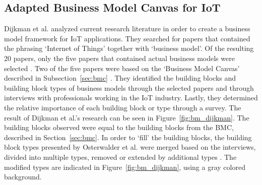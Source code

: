 	\subsection{Adapted Business Model Canvas for IoT}
	\vspace{-1em}
		Dijkman et al. \cite{dijkman} analyzed current research literature in order to create a business model framework for IoT applications. They searched for papers that contained the phrasing `Internet of Things' together with `business model'. Of the resulting 20 papers, only the five papers that contained actual business models were selected \cite{bucherer} \cite{fan} \cite{lixu} \cite{liu} \cite{sun}. Two of the five papers were based on the `Business Model Canvas' described in Subsection~\ref{sec:bmc} \cite{bucherer} \cite{sun}. They identified the building blocks and building block types of business models through the selected papers and through interviews with professionals working in the IoT industry. Lastly, they determined the relative importance of each building block or type through a survey. The result of Dijkman et al.'s research can be seen in Figure~\ref{fig:bm_dijkman}. The building blocks observed were equal to the building blocks from the BMC, described in Section~\ref{sec:bmc}. In order to `fill' the building blocks, the building block types presented by Osterwalder et al. were merged based on the interviews, divided into multiple types, removed or extended by additional types \cite{osterwalder2010} \cite{dijkman}. The modified types are indicated in Figure~\ref{fig:bm_dijkman}, using a gray colored background. 
